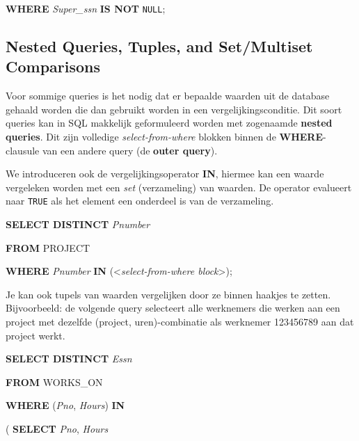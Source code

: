 \vspace{1mm}\hspace{10mm}
\textbf{WHERE} \textit{Super\_ssn} \textbf{IS NOT} \texttt{NULL};


\subsection{Nested Queries, Tuples, and Set/Multiset Comparisons}
Voor sommige queries is het nodig dat er bepaalde waarden uit de database gehaald worden die dan gebruikt worden in een vergelijkingsconditie. Dit soort queries kan in SQL makkelijk geformuleerd worden met zogenaamde \textbf{nested queries}. Dit zijn volledige \textit{select-from-where} blokken binnen de \textbf{WHERE}-clausule van een andere query (de \textbf{outer query}).

We introduceren ook de vergelijkingsoperator \textbf{IN}, hiermee kan een waarde vergeleken worden met een \textit{set} (verzameling) van waarden. De operator evalueert naar \texttt{TRUE} als het element een onderdeel is van de verzameling.

\vspace{1mm}\hspace{10mm}
\textbf{SELECT DISTINCT} \textit{Pnumber}

\hspace{10mm}
\textbf{FROM} PROJECT

\hspace{10mm}
\textbf{WHERE} \textit{Pnumber} \textbf{IN} ({\textless}\textit{select-from-where block}{\textgreater});
\vspace{3mm}

\noindent Je kan ook tupels van waarden vergelijken door ze binnen haakjes te zetten. Bijvoorbeeld: de volgende query selecteert alle werknemers die werken aan een project met dezelfde (project, uren)-combinatie als werknemer 123456789 aan dat project werkt.

\vspace{1mm}\hspace{10mm}
\textbf{SELECT DISTINCT} \textit{Essn}

\hspace{10mm}
\textbf{FROM} WORKS\_ON

\hspace{10mm}
\textbf{WHERE} (\textit{Pno}, \textit{Hours}) \textbf{IN}

\hspace{40mm}
( \textbf{SELECT} \textit{Pno}, \textit{Hours}

